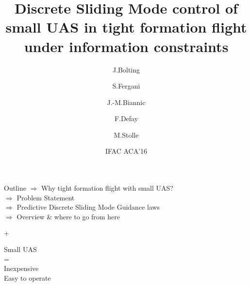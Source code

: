 \documentclass[12pt,svgnames,table,draft=false]{beamer}
\begin{document}
\usebackgroundtemplate{
}

\title{Discrete Sliding Mode control of small UAS in tight formation flight under information constraints}

\author{J.Bolting \and S.Fergani \and J.-M.Biannic \and F.Defay \and M.Stolle}
  
 
\date{IFAC ACA'16}

\maketitle

\usebackgroundtemplate{}

\begin{frame}{Outline}
  $\Rightarrow$ Why tight formation flight with small UAS?\\
  \vspace{1em}
  $\Rightarrow$ Problem Statement\\
  \vspace{1em}  
  $\Rightarrow$ Predictive Discrete Sliding Mode Guidance laws \\
  \vspace{1em}  
  $\Rightarrow$ Overview \& where to go from here\\
\end{frame}

\begin{frame}{+}
\vspace{7em}
\centering
	\begin{tcolorbox}[width=.8\textwidth,colback={gray!10!}]  
	\centering
	\Large
	Small UAS \\
	= \\
	Inexpensive \\
	Easy to operate
	\end{tcolorbox}  
	
\end{frame}
\end{document}
